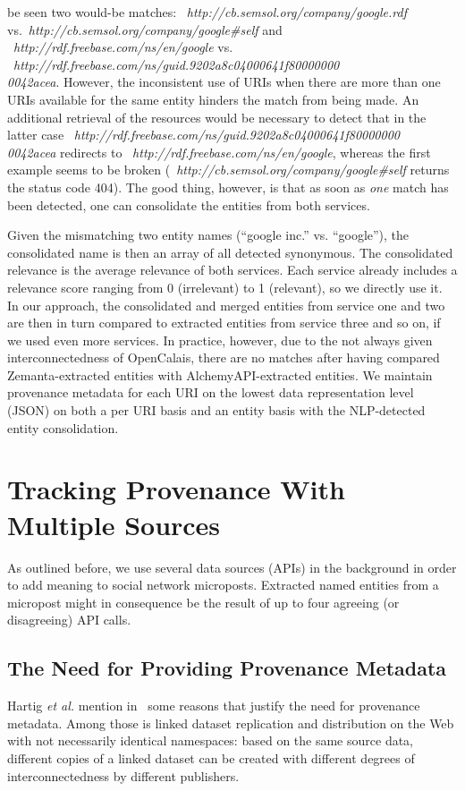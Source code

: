 \documentclass[twocolumn]{article}
\newcommand{\nofootnote}[1]{~#1}
\begin{document}
be seen two would-be matches: \nofootnote{\textit{http://cb.semsol.org/company/google.rdf}}
vs.\nofootnote{\textit{http://cb.semsol.org/company/google\#self}} and
\nofootnote{\textit{http://rdf.freebase.com/ns/en/google}} vs.
\nofootnote{\textit{http://rdf.freebase.com/ns/guid.9202a8c04000641f80000000\\0042acea}}. However, the inconsistent use of
URIs when there are more than one URIs available for the same entity hinders the match from being made. An additional
retrieval of the resources would be necessary to detect that in the latter case
\nofootnote{\textit{http://rdf.freebase.com/ns/guid.9202a8c04000641f80000000\\0042acea}} redirects to
\nofootnote{\textit{http://rdf.freebase.com/ns/en/google}}, whereas the first example seems to be broken
(\nofootnote{\textit{http://cb.semsol.org/company/google\#self}} returns the status code 404). The good thing, however, is
that as soon as \emph{one} match has been detected, one can consolidate the entities from both services.

Given the mismatching two entity names (``google inc.'' vs. ``google''), the consolidated name is then an array of all
detected synonymous. The consolidated relevance is the average relevance of both services. Each service already includes a relevance score ranging from
0 (irrelevant) to 1 (relevant), so we directly use it. In our approach, the consolidated and merged entities from
service one and two are then in turn compared to extracted entities from service three and so on, if we used even more
services. In practice, however, due to the not always given interconnectedness of OpenCalais, there are no matches
after having compared Zemanta-extracted entities with AlchemyAPI-extracted entities. We maintain provenance metadata for each URI on the lowest data representation level (JSON)
on both a per URI basis and an entity basis with the NLP-detected entity consolidation.

\section{Tracking Provenance With Multiple Sources}                    \label{sec:tracking}
As outlined before, we use several data sources (APIs) in the background in order to add meaning to social network microposts. Extracted named entities from a micropost might in consequence be the result of up to four agreeing (or disagreeing) API calls. 

\subsection{The Need for Providing Provenance Metadata}
Hartig \emph{et al.} mention in~\cite{ipaw10:olaf} some reasons that justify the need for provenance metadata. Among those is linked dataset replication and distribution on the Web with not necessarily identical namespaces: based on the same source data, different copies of a linked dataset can be created with different degrees of interconnectedness by different publishers.
\end{document}
